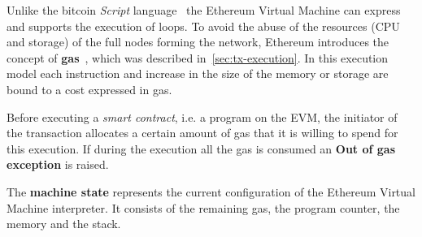 Unlike the bitcoin \textit{Script} language~\cite{bib:masteringbitcoin} the
Ethereum Virtual Machine can express and supports the execution of loops.
To avoid the abuse of the resources (CPU and storage) of the full nodes
forming the network, Ethereum introduces the concept of
\textbf{gas}~\cite{wood2018ethereum}, which was described
in~\autoref{sec:tx-execution}. In this
execution model each instruction and increase in the size of the memory or
storage are bound to a cost expressed in gas.


Before executing a \emph{smart contract}, i.e. a program on the EVM, the
initiator of the transaction allocates a certain amount of gas that it is
willing to spend for this execution.
If during the execution all the gas is consumed an \textbf{Out of gas exception}
is raised.




The \textbf{machine state} represents the current configuration of the
Ethereum Virtual Machine interpreter.
It consists of the remaining gas, the program counter, the memory and the
stack.
